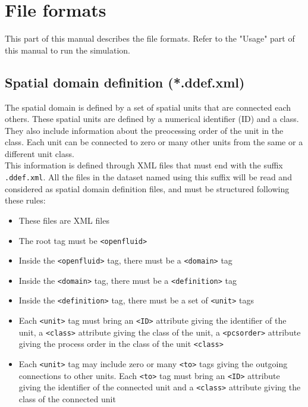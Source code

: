 \chapter{File formats}

This part of this manual describes the file formats. Refer to the "Usage" part of this manual to run the simulation.

\section{Spatial domain definition (*.ddef.xml)}

The spatial domain is defined by a set of spatial units that are connected each others.
These spatial units are defined by a numerical identifier (ID) and a class.
They also include information about the preocessing order of the unit in the class.
Each unit can be connected to zero or many other units from the same or a different unit class.\\
\noindent This information is defined through XML files that must end with the
suffix \texttt{.ddef.xml}. All the files in the dataset named using this suffix will be read and considered as spatial domain definition files, and must be
structured following these rules:
\begin{itemize}
  \item These files are XML files
  \item The root tag must be \texttt{<openfluid>}
  \item Inside the \texttt{<openfluid>} tag, there must be a \texttt{<domain>} tag
  \item Inside the \texttt{<domain>} tag, there must be a \texttt{<definition>} tag
  \item Inside the \texttt{<definition>} tag, there must be a set of \texttt{<unit>} tags 
  \item Each \texttt{<unit>} tag must bring an \texttt{<ID>} attribute giving
  the identifier of the unit, a \texttt{<class>} attribute giving the class of
  the unit, a \texttt{<pcsorder>} attribute giving the process order in the
  class of the unit \texttt{<class>}
  \item Each \texttt{<unit>} tag may include zero or many \texttt{<to>} tags giving
  the outgoing connections to other units. Each \texttt{<to>} tag must bring an \texttt{<ID>} attribute giving
  the identifier of the connected unit and a \texttt{<class>} attribute giving the class of
  the connected unit  
\end{itemize}

